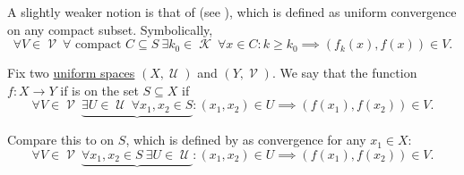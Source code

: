 \begin{definition}
  A slightly weaker notion is that of  (see \cite{ProofWiki:compact_convergence}), which is defined as uniform convergence on any compact subset. Symbolically,
  \begin{equation}\label{def:function_net_convergence/compact}
    \forall V \in \mscrV \ \forall \text{ compact } C \subseteq S \ \exists k_0 \in \mscrK \ \forall x \in C : k \geq k_0 \implies (f_k(x), f(x)) \in V.
  \end{equation}
\end{definition}

\begin{definition}\label{def:uniform_continuity}\mcite\cite[435]{Engelking1989}
  Fix two \hyperref[def:uniform_space]{uniform spaces} \( (X, \mscrU) \) and \( (Y, \mscrV) \). We say that the function \( f: X \to Y \) if is  on the set \( S \subseteq X \) if
  \begin{equation}\label{def:uniform_continuity/uniform}
    \forall V \in \mscrV \ \underbrace{\exists U \in \mscrU \ \forall x_1, x_2 \in S} : (x_1, x_2) \in U \implies (f(x_1), f(x_2)) \in V.
  \end{equation}

  Compare this to  on \( S \), which is defined by  as convergence for any \( x_1 \in X \):
  \begin{equation}\label{def:uniform_continuity/pointwise}
    \forall V \in \mscrV \ \underbrace{\forall x_1, x_2 \in S \ \exists U \in \mscrU} : (x_1, x_2) \in U \implies (f(x_1), f(x_2)) \in V.
  \end{equation}
\end{definition}

